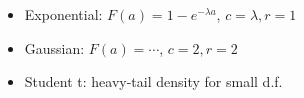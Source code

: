 \begin{example}
    $~$
    \begin{itemize}
        \item Exponential: $F(a)=1-e^{-\lambda a}$, $c=\lambda,r=1$
        \item Gaussian: $F(a)=\cdots$, $c=2,r=2$
        \item Student t: heavy-tail density for small d.f.
    \end{itemize}
\end{example}

\newpage